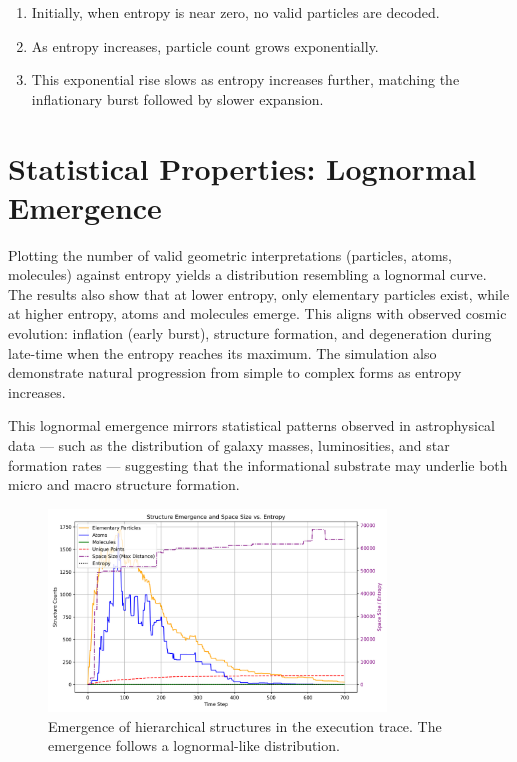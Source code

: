 \documentclass[11pt]{article}
\begin{document}
\begin{enumerate}
   \item Initially, when entropy is near zero, no valid particles are decoded.
   \item As entropy increases, particle count grows exponentially.
   \item This exponential rise slows as entropy increases further, matching the inflationary burst followed by slower expansion.
\end{enumerate}



\section{Statistical Properties: Lognormal Emergence}

Plotting the number of valid geometric interpretations (particles, atoms, molecules) against entropy yields a distribution resembling a lognormal curve.  The results also show that at lower entropy, only elementary particles exist, while at higher entropy, atoms and molecules emerge. This aligns with observed cosmic evolution: inflation (early burst), structure formation, and degeneration during late-time when the entropy reaches its maximum. The simulation also demonstrate natural progression from simple to complex forms as entropy increases.

This lognormal emergence mirrors statistical patterns observed in astrophysical data — such as the distribution of galaxy masses, luminosities, and star formation rates — suggesting that the informational substrate may underlie both micro and macro structure formation.


\begin{figure}[h!]
   \centering
   \includegraphics[width=0.8\textwidth]{figures/entropy_to_matter.png}
   \caption{Emergence of hierarchical structures in the execution trace. The emergence follows a lognormal-like distribution.}
   \label{fig:lognormal-structure}
\end{figure}
\end{document}
